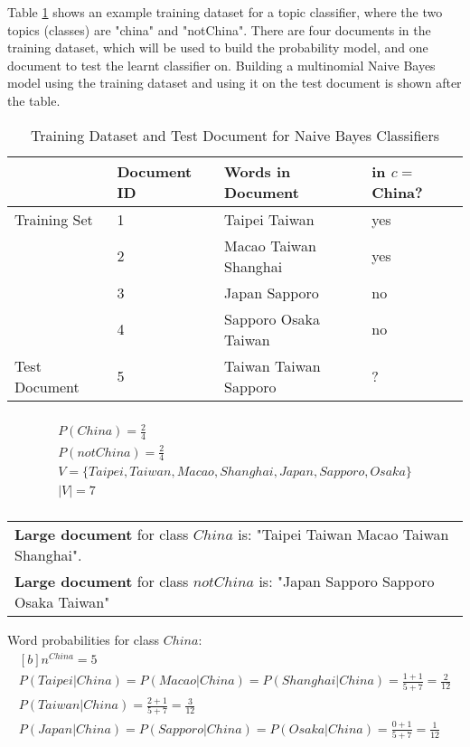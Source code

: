 \documentclass{article}
\begin{document}
Table \ref{tab:example-naive-bayes} shows an example training dataset for a topic classifier, where the two topics (classes) are "china" and "notChina". There are four documents in the training dataset, which will be used to build the probability model, and one document to test the learnt classifier on. Building a multinomial Naive Bayes model using the training dataset and using it on the test document is shown after the table.

\begin{table}[H]
	\centering
	\begin{tabular}{|l|l|l|l|}
	\hline
	& \textbf{Document ID} & \textbf{Words in Document} & \textbf{in $c=$China?} \\
	\hline
	Training Set & 1 & Taipei Taiwan & yes \\
	& 2 & Macao Taiwan Shanghai & yes \\
	& 3 & Japan Sapporo & no \\
	& 4 & Sapporo Osaka Taiwan & no \\
	\hline
	Test Document & 5 & Taiwan Taiwan Sapporo & ? \\
	\hline 
	\end{tabular}
	\caption{Training Dataset and Test Document for Naive Bayes Classifiers}
	\label{tab:example-naive-bayes}
\end{table}

\begin{multline}\\
	P(China) = \frac{2}{4} \\
	P(notChina) = \frac{2}{4} \\
	V = \lbrace Taipei, Taiwan, Macao, Shanghai, Japan, Sapporo, Osaka \rbrace \\
	|V| = 7 \\
\label{eq:example-class-prob}
\end{multline}

\begin{tabular}{l}
\textbf{Large document} for class $China$ is: "Taipei Taiwan Macao Taiwan Shanghai". \\
\textbf{Large document} for class $notChina$ is: "Japan Sapporo Sapporo Osaka Taiwan" \\
\end{tabular}

\hspace{2pt}

Word probabilities for class $China$:
\begin{equation}
\begin{aligned}[b]
n^{China} = 5 \\
P(Taipei|China) = P(Macao|China) = P(Shanghai|China) = \frac{1 + 1}{5 + 7} = \frac{2}{12} \\
P(Taiwan|China) = \frac{2 + 1}{5 + 7} = \frac{3}{12} \\
P(Japan|China) = P(Sapporo|China) = P(Osaka|China) = \frac{0 + 1}{5 + 7} = \frac{1}{12}
\end{aligned}
\end{equation}
\end{document}
